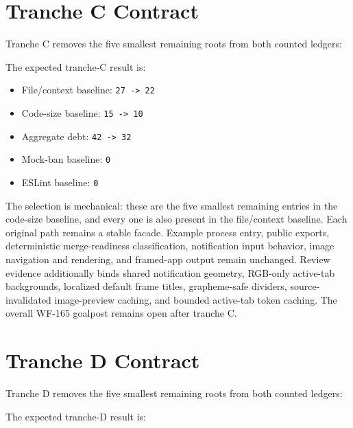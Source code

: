 \section{Tranche C Contract}\label{record-247-tranche-c-contract}

Tranche C removes the five smallest remaining roots from both counted ledgers:



The expected tranche-C result is:

\begin{itemize}
\tightlist
\item
  File/context baseline: \texttt{2\allowbreak{}7\allowbreak{} \allowbreak{}-\allowbreak{}>\allowbreak{} \allowbreak{}2\allowbreak{}2}
\item
  Code-size baseline: \texttt{1\allowbreak{}5\allowbreak{} \allowbreak{}-\allowbreak{}>\allowbreak{} \allowbreak{}1\allowbreak{}0}
\item
  Aggregate debt: \texttt{4\allowbreak{}2\allowbreak{} \allowbreak{}-\allowbreak{}>\allowbreak{} \allowbreak{}3\allowbreak{}2}
\item
  Mock-ban baseline: \texttt{0}
\item
  ESLint baseline: \texttt{0}
\end{itemize}

The selection is mechanical: these are the five smallest remaining entries in the code-size baseline, and every one is also present in the file/context baseline. Each original path remains a stable facade. Example process entry, public exports, deterministic merge-readiness classification, notification input behavior, image navigation and rendering, and framed-app output remain unchanged. Review evidence additionally binds shared notification geometry, RGB-only active-tab backgrounds, localized default frame titles, grapheme-safe dividers, source-invalidated image-preview caching, and bounded active-tab token caching. The overall WF-165 goalpost remains open after tranche C.

\section{Tranche D Contract}\label{record-247-tranche-d-contract}

Tranche D removes the five smallest remaining roots from both counted ledgers:



The expected tranche-D result is:

